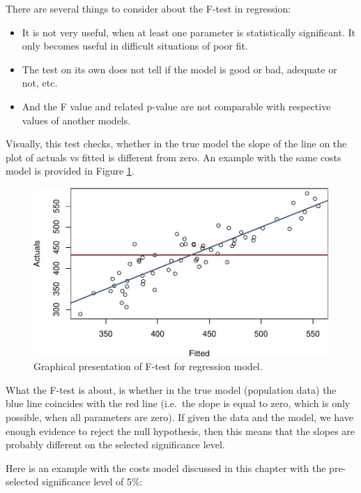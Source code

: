 \documentclass[
]{book}
\providecommand{\tightlist}{%
  \setlength{\itemsep}{0pt}\setlength{\parskip}{0pt}}
\theoremstyle{definition}
\theoremstyle{definition}
\theoremstyle{definition}
\theoremstyle{definition}
\theoremstyle{remark}
\begin{document}
There are several things to consider about the F-test in regression:

\begin{itemize}
\tightlist
\item
  It is not very useful, when at least one parameter is statistically significant. It only becomes useful in difficult situations of poor fit.
\item
  The test on its own does not tell if the model is good or bad, adequate or not, etc.
\item
  And the F value and related p-value are not comparable with respective values of another models.
\end{itemize}

Visually, this test checks, whether in the true model the slope of the line on the plot of actuals vs fitted is different from zero. An example with the same costs model is provided in Figure \ref{fig:costsModelHypothesesF}.

\begin{figure}
\centering
\includegraphics{Svetunkov---Statistics-for-Business-Analytics_files/figure-latex/costsModelHypothesesF-1.pdf}
\caption{\label{fig:costsModelHypothesesF}Graphical presentation of F-test for regression model.}
\end{figure}

What the F-test is about, is whether in the true model (population data) the blue line coincides with the red line (i.e.~the slope is equal to zero, which is only possible, when all parameters are zero). If given the data and the model, we have enough evidence to reject the null hypothesis, then this means that the slopes are probably different on the selected significance level.

Here is an example with the costs model discussed in this chapter with the pre-selected significance level of 5\%:
\end{document}
